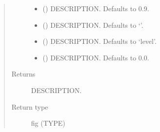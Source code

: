 \documentclass[letterpaper,10pt,english]{sphinxmanual}
\begin{document}
\begin{fulllineitems}
\begin{fulllineitems}
\begin{quote}
\begin{description}
\begin{itemize}
\item {} 
\sphinxAtStartPar
{} (\sphinxstyleliteralemphasis{\sphinxupquote{, }}) \textendash{} DESCRIPTION. Defaults to 0.9.

\item {} 
\sphinxAtStartPar
{} (\sphinxstyleliteralemphasis{\sphinxupquote{, }}) \textendash{} DESCRIPTION. Defaults to ‘’.

\item {} 
\sphinxAtStartPar
{} (\sphinxstyleliteralemphasis{\sphinxupquote{, }}) \textendash{} DESCRIPTION. Defaults to ‘level’.

\item {} 
\sphinxAtStartPar
{} (\sphinxstyleliteralemphasis{\sphinxupquote{, }}) \textendash{} DESCRIPTION. Defaults to 0.0.

\end{itemize}

\item[{Returns}] \leavevmode
\sphinxAtStartPar
DESCRIPTION.

\item[{Return type}] \leavevmode
\sphinxAtStartPar
fig (TYPE)

\end{description}\end{quote}

\end{fulllineitems}



\end{fulllineitems}
\end{document}
